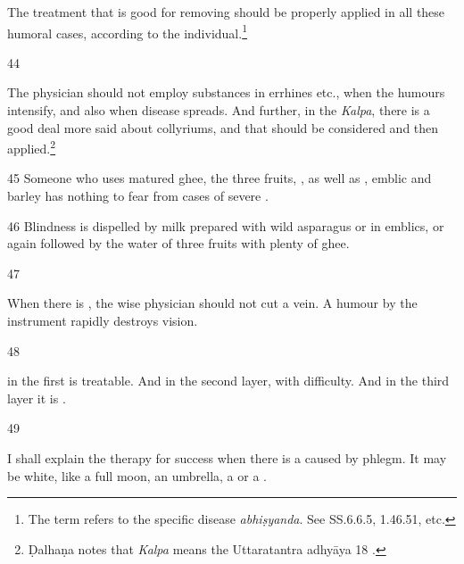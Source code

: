 \begin{translation}
    The treatment that is good for removing  should be 
    properly
    applied in all these humoral cases, according to the individual.\footnote{The term
     refers to the specific disease \emph{abhiṣyanda}.  See
    SS.6.6.5, 1.46.51, etc.}
    
    \item[44] %
    
    The physician should not employ substances in errhines etc., when the humours intensify, 
    and also when disease spreads.  And further, in the \emph{Kalpa}, there is a good deal 
    more 
    said about collyriums, and that should be considered and then applied.\footnote{Ḍalhaṇa 
    notes that \emph{Kalpa} means the Uttaratantra adhyāya 18 \citep[633\,ff]{vulgate}.}
    
    \item[45] 
    Someone who uses matured ghee, the three fruits, , 
    as well as
    , emblic and barley
    has nothing to fear from cases of severe .
    
    \item[46] Blindness is dispelled by milk prepared with wild asparagus or in
    emblics, or again  followed by the water of three
    fruits with plenty of ghee.
    
    \item[47]
    
    When there is , the wise physician should
    not cut a vein.  A humour  by the instrument rapidly
    destroys vision.
    
    \item[48] 
    
     in the first  is
    treatable.  And  in the second layer, with
    difficulty.
    And in the third layer it is .
    
    
    \item [49]
    
    I shall explain the therapy for success when there is a 
    caused by phlegm.   It may be white, like a full moon, an umbrella, a
     or a .
    

\end{translation}
